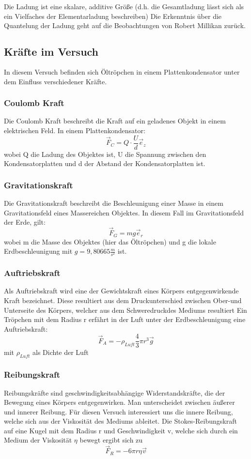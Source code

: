 \documentclass{scrartcl}
\begin{document}
		Die Ladung ist eine skalare, additive Größe (d.h. die Gesamtladung lässt sich als ein Vielfaches der Elementarladung beschreiben)
		Die Erkenntnis über die Quantelung der Ladung geht auf die Beobachtungen von Robert Millikan zurück.

	\subsection{Kräfte im Versuch}
		In diesem Versuch befinden sich Öltröpchen in einem Plattenkondensator unter dem Einfluss verschiedener Kräfte.
		\subsubsection{Coulomb Kraft}
			Die Coulomb Kraft beschreibt die Kraft auf ein geladenes Objekt in einem elektrischen Feld.
			In einem Plattenkondensator:
			\begin{equation}
				\vec{F}_C = Q \cdot \frac{U}{d} \vec{e}_z
			\end{equation}
			wobei Q die Ladung des Objektes ist, U die Spannung zwischen den Kondensatorplatten und d der Abstand der Kondensatorplatten ist.	
		\subsubsection{Gravitationskraft}
			Die Gravitationskraft beschreibt die Beschleunigung einer Masse in einem Gravitationsfeld eines Massereichen Objektes.
			In diesem Fall im Gravitationsfeld der Erde, gilt:
			\begin{equation}
				\vec{F}_G = mg \vec{e}_r
			\end{equation}
			wobei m die Masse des Objektes (hier das Öltröpchen) und g die lokale Erdbeschleunigung mit $g = 9,80665 \frac{m}{s^2}$ ist.
		\subsubsection{Auftriebskraft}
			Als Auftriebskraft wird eine der Gewichtskraft eines Körpers entgegenwirkende Kraft bezeichnet. Diese resultiert aus dem Druckunterschied zwischen Ober-und Unterseite des Körpers, welcher aus dem Schweredruckdes Mediums resultiert
			Ein Tröpchen mit dem Radius r erfährt in der Luft unter der Erdbeschleunigung eine Auftriebskraft:
			\begin{equation}
				\vec{F}_A = - \rho_{Luft} \frac{4}{3} \pi r^3 \vec{g}
			\end{equation}
			mit $\rho_{Luft}$ als Dichte der Luft
		\subsubsection{Reibungskraft}
			Reibungskräfte sind geschwindigkeitsabhängige Widerstandskräfte, die der Bewegung eines Körpers entgegenwirken.
			Man unterscheidet zwischen äußerer und innerer Reibung. Für diesen Versuch interessiert uns die innere Reibung, welche sich aus der Viskosität des Mediums ableitet.
			Die Stokes-Reibungskraft auf eine Kugel mit dem Radius r und Geschwindigkeit v, welche sich durch ein Medium der Viskosität $\eta$ bewegt ergibt sich zu
			\begin{equation}
				\vec{F}_R = -6 \pi r \eta \vec{v}
			\end{equation}
\end{document}
